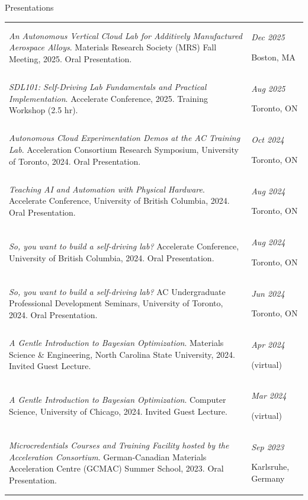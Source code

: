 \documentclass{resume} %
\begin{document}
\begin{rSection}{Presentations}
\renewcommand{\arraystretch}{1.5}
\begin{longtable}{m{13cm} m{3.5cm}}

{\textit{An Autonomous Vertical Cloud Lab for Additively Manufactured Aerospace Alloys}. Materials Research Society (MRS) Fall Meeting, 2025. Oral Presentation.} & {\em \hfill Dec 2025 \par \hfill Boston, MA} \\
{\textit{SDL101: Self-Driving Lab Fundamentals and Practical Implementation}. Accelerate Conference, 2025. Training Workshop (2.5 hr).} & {\em \hfill Aug 2025 \par \hfill Toronto, ON} \\
{\textit{Autonomous Cloud Experimentation Demos at the AC Training Lab}. Acceleration Consortium Research Symposium, University of Toronto, 2024. Oral Presentation.} & {\em \hfill Oct 2024 \par \hfill Toronto, ON} \\
{\textit{Teaching AI and Automation with Physical Hardware}. Accelerate Conference, University of British Columbia, 2024. Oral Presentation.} & {\em \hfill Aug 2024 \par \hfill Toronto, ON} \\
{\textit{So, you want to build a self-driving lab?} Accelerate Conference, University of British Columbia, 2024. Oral Presentation.} & {\em \hfill Aug 2024 \par \hfill Toronto, ON} \\
{\textit{So, you want to build a self-driving lab?} AC Undergraduate Professional Development Seminars, University of Toronto, 2024. Oral Presentation.} & {\em \hfill Jun 2024 \par \hfill Toronto, ON} \\
{\textit{A Gentle Introduction to Bayesian Optimization}. Materials Science \& Engineering, North Carolina State University, 2024. Invited Guest Lecture.} & {\em \hfill Apr 2024 \par \hfill (virtual)} \\
{\textit{A Gentle Introduction to Bayesian Optimization}. Computer Science, University of Chicago, 2024. Invited Guest Lecture.} & {\em \hfill Mar 2024 \par \hfill (virtual)} \\
{\textit{Microcredentials Courses and Training Facility hosted by the Acceleration Consortium}. German-Canadian Materials Acceleration Centre (GCMAC) Summer School, 2023. Oral Presentation.} & {\em \hfill Sep 2023 \par \hfill Karlsruhe, Germany} \\

\end{longtable}
\end{rSection}
\end{document}
